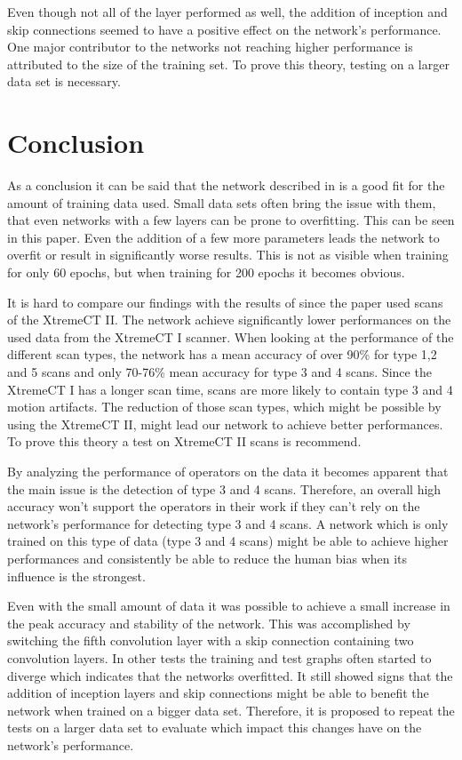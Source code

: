\documentclass[
a4paper, 
12pt,
grayscalebody, %
abstract=on,
twoside, BCOR10mm, 12pt, DIV13,headinclude, footexclude, final, abstracton, openright
]{ibireprt}
\numberwithin{equation}{chapter}
\numberwithin{table}{chapter}
\numberwithin{figure}{chapter}
\numberwithin{algorithm}{chapter}
\numberwithin{example}{chapter}
\numberwithin{example}{chapter}
\begin{document}
Even though not all of the layer performed as well, the addition of inception and skip connections seemed to have a positive effect on the network's performance. One major contributor to the networks not reaching higher performance is attributed to the size of the training set. To prove this theory, testing on a larger data set is necessary. 

\chapter{Conclusion}
As a conclusion it can be said that the network described in \cite{Walle2023} is a good fit for the amount of training data used. Small data sets often bring the issue with them, that even networks with a few layers can be prone to overfitting. This can be seen in this paper. Even the addition of a few more parameters leads the network to overfit or result in significantly worse results. This is not as visible when training for only 60 epochs, but when training for 200 epochs it becomes obvious.

It is hard to compare our findings with the results of \cite{Walle2023} since the paper used scans of the XtremeCT II. The network achieve significantly lower performances on the used data from the XtremeCT I scanner. When looking at the performance of the different scan types, the network has a mean accuracy of over 90\% for type 1,2 and 5 scans and only 70-76\% mean accuracy for type 3 and 4 scans. Since the XtremeCT I has a longer scan time, scans are more likely to contain type 3 and 4 motion artifacts. The reduction of those scan types, which might be possible by using the XtremeCT II, might lead our network to achieve better performances. To prove this theory a test on XtremeCT II scans is recommend. 

By analyzing the performance of operators on the data it becomes apparent that the main issue is the detection of type 3 and 4 scans. Therefore, an overall high accuracy won't support the operators in their work if they can't rely on the network's performance for detecting type 3 and 4 scans. A network which is only trained on this type of data (type 3 and 4 scans) might be able to achieve higher performances and consistently be able to reduce the human bias when its influence is the strongest. 

Even with the small amount of data it was possible to achieve a small increase in the peak accuracy and stability of the network. This was accomplished by switching the fifth convolution layer with a skip connection containing two convolution layers. In other tests the training and test graphs often started to diverge which indicates that the networks overfitted. It still showed signs that the addition of inception layers and skip connections might be able to benefit the network when trained on a bigger data set. Therefore, it is proposed to repeat the tests on a larger data set to evaluate which impact this changes have on the network's performance. 




\end{document}
